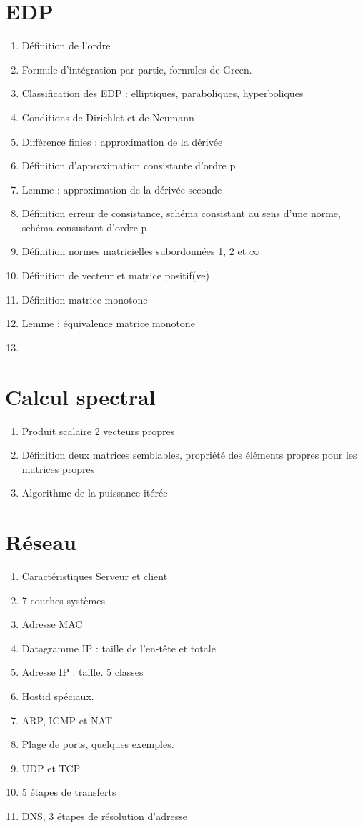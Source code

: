 \documentclass[11pt, twocolumn, landscape]{article}
\begin{document}
\part{EDP}
\begin{enumerate}
\item Définition de l'ordre
\item Formule d'intégration par partie, formules de Green.
\item Classification des EDP : elliptiques, paraboliques, hyperboliques
\item Conditions de Dirichlet et de Neumann
\item Différence finies : approximation de la dérivée
\item Définition d'approximation consistante d'ordre p
\item Lemme : approximation de la dérivée seconde
\item Définition erreur de consistance, schéma consistant au sens d'une norme, schéma consustant d'ordre p
\item Définition normes matricielles subordonnées 1, 2 et $\infty$
\item Définition de vecteur et matrice positif(ve)
\item Définition matrice monotone
\item Lemme : équivalence matrice monotone
\item 
\end{enumerate}

\part{Calcul spectral}
\begin{enumerate}
\item Produit scalaire 2 vecteurs propres
\item Définition deux matrices semblables, propriété des éléments propres pour les matrices propres
\item Algorithme de la puissance itérée
\end{enumerate}

\part{Réseau}
\begin{enumerate}
	\item Caractéristiques Serveur et client
	\item 7 couches systèmes
	\item Adresse MAC
	\item Datagramme IP : taille de l'en-tête et totale
	\item Adresse IP : taille. 5 classes
	\item Hostid spéciaux.
	\item ARP, ICMP et NAT
	\item Plage de ports, quelques exemples. 
	\item UDP et TCP
	\item 5 étapes de transferts
	\item DNS, 3 étapes de résolution d'adresse
\end{enumerate}
\end{document}
